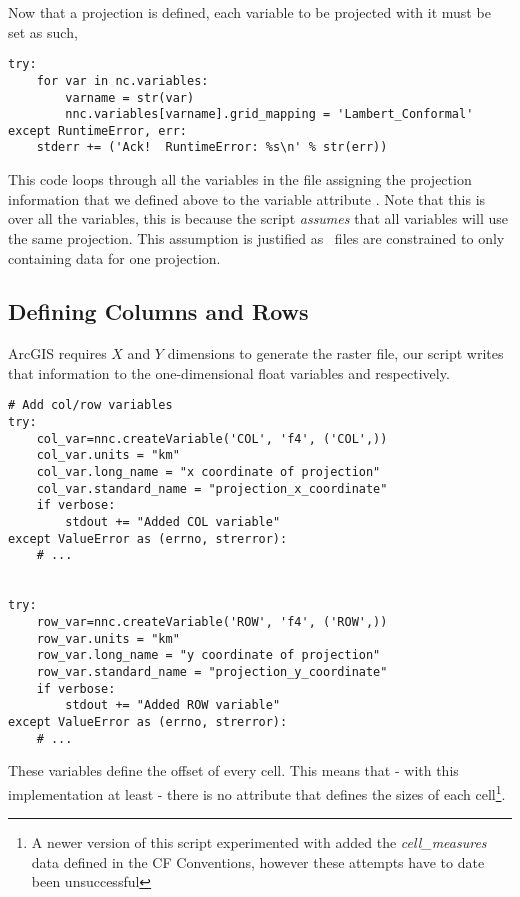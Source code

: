 Now that a projection is defined, each variable to be projected with it must be set as such,

\singlespace
\begin{verbatim}
try:
	for var in nc.variables:
		varname = str(var)
		nnc.variables[varname].grid_mapping = 'Lambert_Conformal'
except RuntimeError, err:
	stderr += ('Ack!  RuntimeError: %s\n' % str(err))
\end{verbatim}
\doublespace

This code loops through all the variables in the file assigning the projection
information that we defined above to the variable attribute
.  Note that this is over all the variables, this is
because the script \emph{assumes} that all variables will use the same
projection.  This assumption is justified as \ioapi~files are constrained to
only containing data for one projection.

\subsection{Defining Columns and Rows}

ArcGIS requires $X$ and $Y$ dimensions to generate the raster file, our script
writes that information to the one-dimensional float variables  and
 respectively.

\singlespace
\begin{verbatim}
# Add col/row variables
try:
	col_var=nnc.createVariable('COL', 'f4', ('COL',))
	col_var.units = "km"
	col_var.long_name = "x coordinate of projection"
	col_var.standard_name = "projection_x_coordinate"
	if verbose:
		stdout += "Added COL variable"
except ValueError as (errno, strerror):
	# ...


try:
	row_var=nnc.createVariable('ROW', 'f4', ('ROW',))
	row_var.units = "km"
	row_var.long_name = "y coordinate of projection"
	row_var.standard_name = "projection_y_coordinate"
	if verbose:
		stdout += "Added ROW variable"
except ValueError as (errno, strerror):
	# ...
\end{verbatim}
\doublespace

These variables define the offset of every cell.  This means that -
with this implementation at least - there is no attribute that defines
the sizes of each cell\footnote{A newer version of this script
experimented with added the \emph{cell\_measures} data defined in the
CF Conventions, however these attempts have to date been unsuccessful}.

